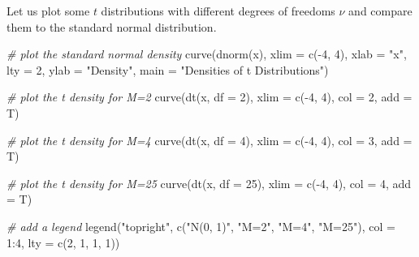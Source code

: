 \documentclass[
  14pt,
]{memoir}
\newenvironment{Shaded}{\begin{snugshade}}{\end{snugshade}}
\newcommand{\AttributeTok}[1]{\textcolor[rgb]{0.77,0.63,0.00}{#1}}
\newcommand{\CommentTok}[1]{\textcolor[rgb]{0.56,0.35,0.01}{\textit{#1}}}
\newcommand{\DecValTok}[1]{\textcolor[rgb]{0.00,0.00,0.81}{#1}}
\newcommand{\FunctionTok}[1]{\textcolor[rgb]{0.00,0.00,0.00}{#1}}
\newcommand{\NormalTok}[1]{#1}
\newcommand{\SpecialCharTok}[1]{\textcolor[rgb]{0.00,0.00,0.00}{#1}}
\newcommand{\StringTok}[1]{\textcolor[rgb]{0.31,0.60,0.02}{#1}}
\begin{document}
Let us plot some \(t\) distributions with different degrees of freedoms \(\nu\) and compare them to the standard normal distribution.

\begin{Shaded}
\begin{Highlighting}[]
\CommentTok{\# plot the standard normal density}
\FunctionTok{curve}\NormalTok{(}\FunctionTok{dnorm}\NormalTok{(x), }
      \AttributeTok{xlim =} \FunctionTok{c}\NormalTok{(}\SpecialCharTok{{-}}\DecValTok{4}\NormalTok{, }\DecValTok{4}\NormalTok{), }
      \AttributeTok{xlab =} \StringTok{"x"}\NormalTok{, }
      \AttributeTok{lty =} \DecValTok{2}\NormalTok{, }
      \AttributeTok{ylab =} \StringTok{"Density"}\NormalTok{, }
      \AttributeTok{main =} \StringTok{"Densities of t Distributions"}\NormalTok{)}

\CommentTok{\# plot the t density for M=2}
\FunctionTok{curve}\NormalTok{(}\FunctionTok{dt}\NormalTok{(x, }\AttributeTok{df =} \DecValTok{2}\NormalTok{), }
      \AttributeTok{xlim =} \FunctionTok{c}\NormalTok{(}\SpecialCharTok{{-}}\DecValTok{4}\NormalTok{, }\DecValTok{4}\NormalTok{), }
      \AttributeTok{col =} \DecValTok{2}\NormalTok{, }
      \AttributeTok{add =}\NormalTok{ T)}

\CommentTok{\# plot the t density for M=4}
\FunctionTok{curve}\NormalTok{(}\FunctionTok{dt}\NormalTok{(x, }\AttributeTok{df =} \DecValTok{4}\NormalTok{), }
      \AttributeTok{xlim =} \FunctionTok{c}\NormalTok{(}\SpecialCharTok{{-}}\DecValTok{4}\NormalTok{, }\DecValTok{4}\NormalTok{), }
      \AttributeTok{col =} \DecValTok{3}\NormalTok{, }
      \AttributeTok{add =}\NormalTok{ T)}

\CommentTok{\# plot the t density for M=25}
\FunctionTok{curve}\NormalTok{(}\FunctionTok{dt}\NormalTok{(x, }\AttributeTok{df =} \DecValTok{25}\NormalTok{), }
      \AttributeTok{xlim =} \FunctionTok{c}\NormalTok{(}\SpecialCharTok{{-}}\DecValTok{4}\NormalTok{, }\DecValTok{4}\NormalTok{), }
      \AttributeTok{col =} \DecValTok{4}\NormalTok{, }
      \AttributeTok{add =}\NormalTok{ T)}

\CommentTok{\# add a legend}
\FunctionTok{legend}\NormalTok{(}\StringTok{"topright"}\NormalTok{, }
       \FunctionTok{c}\NormalTok{(}\StringTok{"N(0, 1)"}\NormalTok{, }\StringTok{"M=2"}\NormalTok{, }\StringTok{"M=4"}\NormalTok{, }\StringTok{"M=25"}\NormalTok{), }
       \AttributeTok{col =} \DecValTok{1}\SpecialCharTok{:}\DecValTok{4}\NormalTok{, }
       \AttributeTok{lty =} \FunctionTok{c}\NormalTok{(}\DecValTok{2}\NormalTok{, }\DecValTok{1}\NormalTok{, }\DecValTok{1}\NormalTok{, }\DecValTok{1}\NormalTok{))}
\end{Highlighting}
\end{Shaded}
\end{document}
